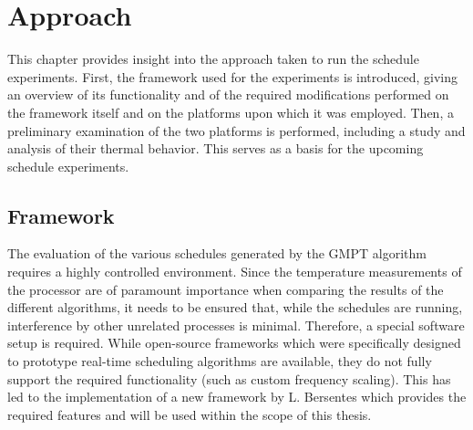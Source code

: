 
\chapter{Approach}\label{chapter:approach}
This chapter provides insight into the approach taken to run the schedule experiments. First, the framework used for the experiments is introduced, giving an overview of its functionality and of the required modifications performed on the framework itself and on the platforms upon which it was employed. Then, a preliminary examination of the two platforms is performed, including a study and analysis of their thermal behavior. This serves as a basis for the upcoming schedule experiments.
\section{Framework}
The evaluation of the various schedules generated by the GMPT algorithm requires a highly controlled environment. Since the temperature measurements of the processor are of paramount importance when comparing the results of the different algorithms, it needs to be ensured that, while the schedules are running, interference by other unrelated processes is minimal. Therefore, a special software setup is required. While open-source frameworks which were specifically designed to prototype real-time scheduling algorithms are available, they do not fully support the required functionality (such as custom frequency scaling). This has led to the implementation of a new framework by L. Bersentes \cite{Bersentes2017} which provides the required features and will be used within the scope of this thesis.
